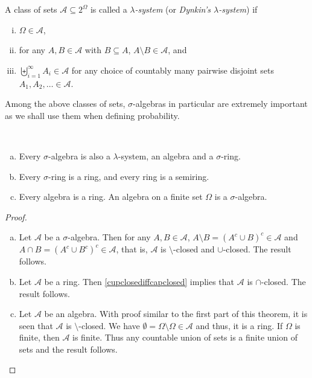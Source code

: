 \begin{definition}
\label{defLamSystem}
    A class of sets $\mathcal{A}\subseteq2^\Omega$ is called a \textit{$\lambda$-system} (or \textit{Dynkin's $\lambda$-system}) if
    \begin{enumerate}[(i)]
        \item $\Omega\in\mathcal{A}$,
        \item for any $A,B\in\mathcal{A}$ with $B\subseteq A$, $A\setminus B\in\mathcal{A}$, and
        \item $\displaystyle\biguplus_{i=1}^\infty A_i\in\mathcal{A}$ for any choice of countably many pairwise disjoint sets $A_1,A_2,\ldots\in\mathcal{A}$.
    \end{enumerate}
\end{definition}

Among the above classes of sets, $\sigma$-algebras in particular are extremely important as we shall use them when defining probability.

\begin{theorem}
~
    \begin{enumerate}[(a)]
        \item Every $\sigma$-algebra is also a $\lambda$-system, an algebra and a $\sigma$-ring.
        \item Every $\sigma$-ring is a ring, and every ring is a semiring.
        \item Every algebra is a ring. An algebra on a finite set $\Omega$ is a $\sigma$-algebra.
    \end{enumerate}
\end{theorem}
\begin{proof}
~
    \begin{enumerate}[(a)]
        \item Let $\mathcal{A}$ be a $\sigma$-algebra. Then for any $A,B\in\mathcal{A}$, $A\setminus B = (A^c\cup B)^c \in \mathcal{A}$ and $A\cap B=(A^c\cup B^c)^c\in\mathcal{A}$, that is, $\mathcal{A}$ is $\setminus$-closed and $\cup$-closed. The result follows.
        
        \item Let $\mathcal{A}$ be a ring. Then \cref{cupclosediffcapclosed} implies that $\mathcal{A}$ is $\cap$-closed. The result follows.
        
        \item Let $\mathcal{A}$ be an algebra. With proof similar to the first part of this theorem, it is seen that $\mathcal{A}$ is $\setminus$-closed. We have $\emptyset=\Omega\setminus\Omega\in\mathcal{A}$ and thus, it is a ring. If $\Omega$ is finite, then $\mathcal{A}$ is finite. Thus any countable union of sets is a finite union of sets and the result follows.
        \end{enumerate}
\end{proof}

